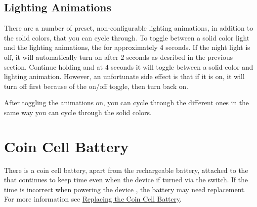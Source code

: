 
\subsection{Lighting Animations}

There are a number of preset, non-configurable lighting animations, in addition
to the solid colors, that you can cycle through.  To toggle between a solid
color light and the lighting animations,  the  for approximately
\num{4} seconds. If the night light is off, it will automatically turn on after
\num{2} seconds as desribed in the previous section.  Continue holding and at
\num{4} seconds it will toggle between a solid color and lighting animation.
However, an unfortunate side effect is that if it is on, it will turn off first
because of the on/off toggle, then turn back on.


After toggling the animations on, you can cycle through the different ones in
the same way you can cycle through the solid colors.

\section{Coin Cell Battery}

There is a  coin cell battery, apart from the rechargeable
battery, attached to the  that continues to keep time even when the
device if turned  via the  switch.  If the time is incorrect
when powering the device , the battery may need replacement.  For more
information see \hyperref[Replacing Battery]{Replacing the Coin Cell Battery}.

